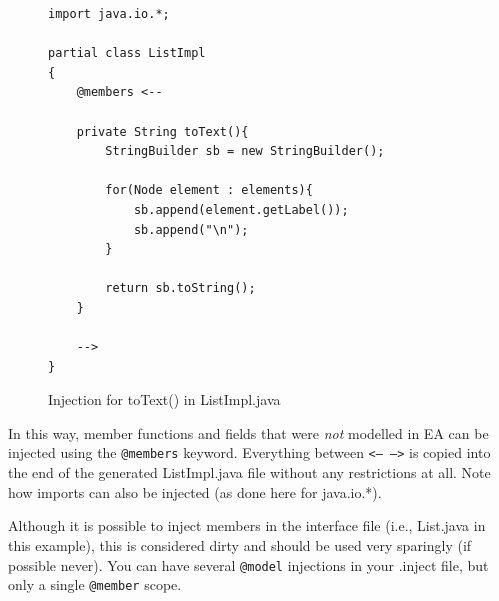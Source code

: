 \begin{figure}[htbp]
\centering
\begin{lstlisting}[language=Injection]
import java.io.*;

partial class ListImpl
{
    @members <--

    private String toText(){
        StringBuilder sb = new StringBuilder();

        for(Node element : elements){
            sb.append(element.getLabel());
            sb.append("\n");
        }

        return sb.toString();
    }

    -->
}
\end{lstlisting}
\caption{Injection for \textsf{toText()} in \textsf{ListImpl.java}}
\label{code:listImpl_toText_impl}
\end{figure}

In this way, member functions and fields that were \emph{not} modelled in EA can be injected using the \texttt{@members} keyword. 
Everything between \texttt{<--  -->} is copied into the end of the generated \textsf{ListImpl.java} file without any restrictions at all.
Note how imports can also be injected (as done here for \textsf{java.io.*}). 

Although it is possible to inject members in the interface file (i.e., \textsf{List.java} in this example), this is considered dirty and should be used very sparingly (if possible never). 
You can have several \texttt{@model} injections in your \textsf{.inject} file, but only a single \texttt{@member} scope.

\clearpage